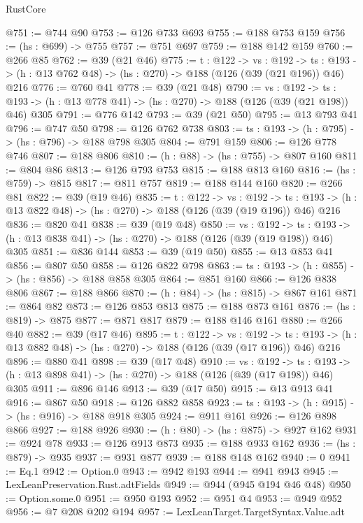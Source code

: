 \begin{lexlean}{RustCore}
\begin{coremodule}
@751 := @744 @90
@753 := @126 @733 @693
@755 := @188 @753 @159
@756 := (hs : @699) -> @755
@757 := @751 @697
@759 := @188 @142 @159
@760 := @266 @85
@762 := @39 (@21 @46)
@775 := {t : @122} ->
  {vs : @192} ->
  {ts : @193} -> (h : @13 @762 @48) -> (hs : @270) -> @188 (@126 (@39 (@21 @196)) @46) @216
@776 := @760 @41
@778 := @39 (@21 @48)
@790 := {vs : @192} ->
  {ts : @193} -> (h : @13 @778 @41) -> (hs : @270) -> @188 (@126 (@39 (@21 @198)) @46) @305
@791 := @776 @142
@793 := @39 (@21 @50)
@795 := @13 @793 @41
@796 := @747 @50
@798 := @126 @762 @738
@803 := {ts : @193} -> (h : @795) -> (hs : @796) -> @188 @798 @305
@804 := @791 @159
@806 := @126 @778 @746
@807 := @188 @806
@810 := (h : @88) -> (hs : @755) -> @807 @160
@811 := @804 @86
@813 := @126 @793 @753
@815 := @188 @813 @160
@816 := (hs : @759) -> @815
@817 := @811 @757
@819 := @188 @144 @160
@820 := @266 @81
@822 := @39 (@19 @46)
@835 := {t : @122} ->
  {vs : @192} ->
  {ts : @193} -> (h : @13 @822 @48) -> (hs : @270) -> @188 (@126 (@39 (@19 @196)) @46) @216
@836 := @820 @41
@838 := @39 (@19 @48)
@850 := {vs : @192} ->
  {ts : @193} -> (h : @13 @838 @41) -> (hs : @270) -> @188 (@126 (@39 (@19 @198)) @46) @305
@851 := @836 @144
@853 := @39 (@19 @50)
@855 := @13 @853 @41
@856 := @807 @50
@858 := @126 @822 @798
@863 := {ts : @193} -> (h : @855) -> (hs : @856) -> @188 @858 @305
@864 := @851 @160
@866 := @126 @838 @806
@867 := @188 @866
@870 := (h : @84) -> (hs : @815) -> @867 @161
@871 := @864 @82
@873 := @126 @853 @813
@875 := @188 @873 @161
@876 := (hs : @819) -> @875
@877 := @871 @817
@879 := @188 @146 @161
@880 := @266 @40
@882 := @39 (@17 @46)
@895 := {t : @122} ->
  {vs : @192} ->
  {ts : @193} -> (h : @13 @882 @48) -> (hs : @270) -> @188 (@126 (@39 (@17 @196)) @46) @216
@896 := @880 @41
@898 := @39 (@17 @48)
@910 := {vs : @192} ->
  {ts : @193} -> (h : @13 @898 @41) -> (hs : @270) -> @188 (@126 (@39 (@17 @198)) @46) @305
@911 := @896 @146
@913 := @39 (@17 @50)
@915 := @13 @913 @41
@916 := @867 @50
@918 := @126 @882 @858
@923 := {ts : @193} -> (h : @915) -> (hs : @916) -> @188 @918 @305
@924 := @911 @161
@926 := @126 @898 @866
@927 := @188 @926
@930 := (h : @80) -> (hs : @875) -> @927 @162
@931 := @924 @78
@933 := @126 @913 @873
@935 := @188 @933 @162
@936 := (hs : @879) -> @935
@937 := @931 @877
@939 := @188 @148 @162
@940 := 0
@941 := Eq.{1}
@942 := Option.{0}
@943 := @942 @193
@944 := @941 @943
@945 := LexLeanPreservation.Rust.adtFields
@949 := @944 (@945 @194 @46 @48)
@950 := Option.some.{0}
@951 := @950 @193
@952 := @951 @4
@953 := @949 @952
@956 := @7 @208 @202 @194
@957 := LexLeanTarget.TargetSyntax.Value.adt

\end{coremodule}
\end{lexlean}
